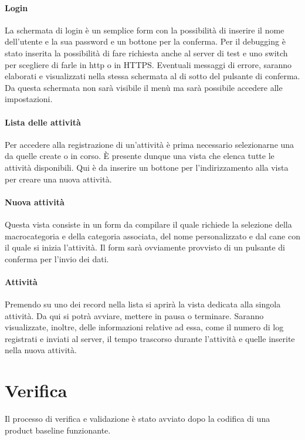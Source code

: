 \paragraph{Login}
La schermata di login è un semplice form con la possibilità di inserire il nome dell'utente e la sua password e un
bottone per la conferma. Per il debugging è stato inserita la possibilità di fare richiesta anche al server di test e
uno switch per scegliere di farle in \acrshort{http} o in HTTPS. Eventuali messaggi di errore, saranno elaborati e
visualizzati nella stessa schermata al di sotto del pulsante di conferma. Da questa schermata non sarà visibile il menù
ma sarà possibile accedere alle impostazioni.

\paragraph{Lista delle attività}
Per accedere alla registrazione di un'attività è prima necessario selezionarne una da quelle create o in corso. È
presente dunque una vista che elenca tutte le attività disponibili. Qui è da inserire un bottone per l'indirizzamento
alla vista per creare una nuova attività. 

\paragraph{Nuova attività}
Questa vista consiste in un form da compilare il quale richiede la selezione della macrocategoria e della categoria
associata, del nome personalizzato e dal cane con il quale si inizia l'attività. Il form sarà ovviamente provvisto di un
pulsante di conferma per l'invio dei dati.

\paragraph{Attività}
Premendo su uno dei record nella lista si aprirà la vista dedicata alla singola attività. Da qui si potrà avviare,
mettere in pausa o terminare. Saranno visualizzate, inoltre, delle informazioni relative ad essa, come il numero di log
registrati e inviati al server, il tempo trascorso durante l'attività e quelle inserite nella nuova attività.

\section{Verifica}
Il processo di verifica e validazione è stato avviato dopo la codifica di una \gls{product baseline} funzionante. 
